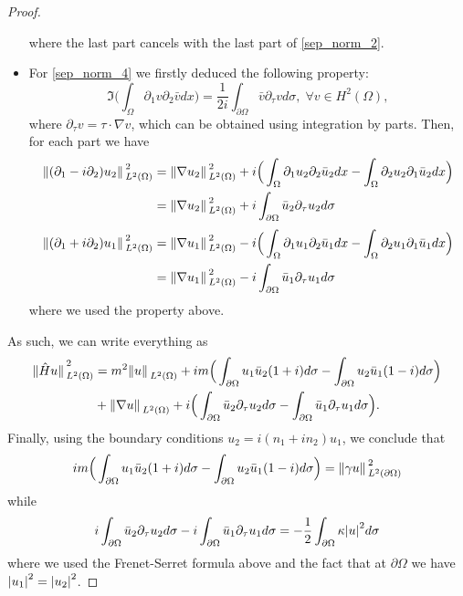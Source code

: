 \begin{proof}
\begin{itemize}
\[                \]
                where the last part cancels with the last part of \eqref{sep_norm_2}.
        \item For \eqref{sep_norm_4} we firstly deduced the following property:
                \[
                \Im \Big(\int_\Omega \partial_1 v \partial_2 \bar{v}dx\Big) = \frac{1}{2 i} \int_{\partial\Omega} \bar{v} \partial_\tau v d \sigma, \; \forall v \in H^2(\Omega),
                \]
                where \(\partial_\tau v= \tau \cdot \nabla v\), which can be obtained using integration by parts.
                Then, for each part we have
                \begin{align*}
                \norm*{(\partial_1 - i \partial_2)u_2}_{L^2(\Omega)}^2 &= \norm*{\nabla u_2}_{L^2(\Omega)}^2 + i \Big(\int_\Omega \partial_1 u_2 \partial_2 \bar{u}_2dx - \int_\Omega \partial_2 u_2 \partial_1 \bar{u}_2dx\Big)\\
                & = \norm*{\nabla u_2}_{L^2(\Omega)}^2 + i\int_{\partial\Omega} \bar{u}_2 \partial_\tau u_2 d \sigma
                \end{align*}
                \vspace*{-1cm}
                \begin{align*}
                \norm*{(\partial_1 + i \partial_2)u_1}_{L^2(\Omega)}^2 &= \norm*{\nabla u_1}_{L^2(\Omega)}^2 - i \Big(\int_\Omega \partial_1 u_1 \partial_2 \bar{u}_1dx - \int_\Omega \partial_2 u_1 \partial_1 \bar{u}_1dx\Big)\\
                & = \norm*{\nabla u_1}_{L^2(\Omega)}^2 - i\int_{\partial\Omega} \bar{u}_1 \partial_\tau u_1 d \sigma
                \end{align*}
                where we used the property above.
    \end{itemize}
    As such, we can write everything as
    \begin{align*}
        \norm*{\hat{H}u}_{L^2(\Omega)}^2 &= m^2 \norm*{u}_{L^2(\Omega)} + i m \Big(\int_{\partial\Omega} u_1\bar{u}_2(1+i)d\sigma - \int_{\partial\Omega} u_2\bar{u}_1(1-i)d\sigma \Big)\\
        & + \norm*{\nabla u}_{L^2(\Omega)} + i\Big( \int_{\partial\Omega} \bar{u}_2 \partial_\tau u_2 d \sigma -  \int_{\partial\Omega} \bar{u}_1 \partial_\tau u_1 d \sigma \Big).
    \end{align*}
    Finally, using the boundary conditions \(u_2 = i(n_1 + i n_2)u_1\), we conclude that
    \begin{align*}
    i m \Big(\int_{\partial\Omega} u_1\bar{u}_2(1+i)d\sigma - \int_{\partial\Omega} u_2\bar{u}_1(1-i)d\sigma \Big) = \norm*{\gamma u}_{L^2(\partial\Omega)}^2
    \end{align*}
    while
    \begin{align*}
    i\int_{\partial\Omega} \bar{u}_2 \partial_\tau u_2 d \sigma -  i\int_{\partial\Omega} \bar{u}_1 \partial_\tau u_1 d \sigma = -\frac{1}{2}\int_{\partial\Omega}\kappa \abs{u}^2 d\sigma
    \end{align*}
    where we used the Frenet-Serret formula above and the fact that at \(\partial\Omega\) we have \(\abs{u_1}^2=\abs{u_2}^2\).
\end{proof}

